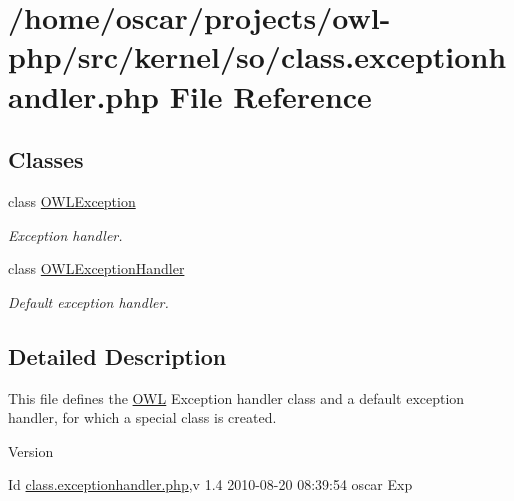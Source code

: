 \section{/home/oscar/projects/owl-\/php/src/kernel/so/class.exceptionhandler.php File Reference}
\label{class_8exceptionhandler_8php}
\subsection*{Classes}
\begin{DoxyCompactItemize}
\item 
class \hyperlink{classOWLException}{OWLException}
\begin{DoxyCompactList}\small\item\em Exception handler. \item\end{DoxyCompactList}\item 
class \hyperlink{classOWLExceptionHandler}{OWLExceptionHandler}
\begin{DoxyCompactList}\small\item\em Default exception handler. \item\end{DoxyCompactList}\end{DoxyCompactItemize}


\subsection{Detailed Description}
This file defines the \hyperlink{classOWL}{OWL} Exception handler class and a default exception handler, for which a special class is created. \begin{DoxyVersion}{Version}

\end{DoxyVersion}
\begin{DoxyParagraph}{Id}
\hyperlink{class_8exceptionhandler_8php}{class.exceptionhandler.php},v 1.4 2010-\/08-\/20 08:39:54 oscar Exp 
\end{DoxyParagraph}
